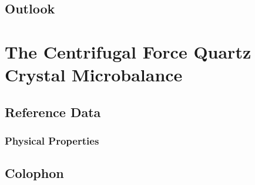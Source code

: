 \documentclass[a4paper,titlepage,onecolumn]{report}
\begin{document}
\chapter{Outlook} \label{ch:outlook}

\part{The Centrifugal Force Quartz Crystal Microbalance}

\chapter{Reference Data} \label{ch:reference}
\section{Physical Properties}
\label{ref:physicalproperties}
\chapter{Colophon}



\end{document}
